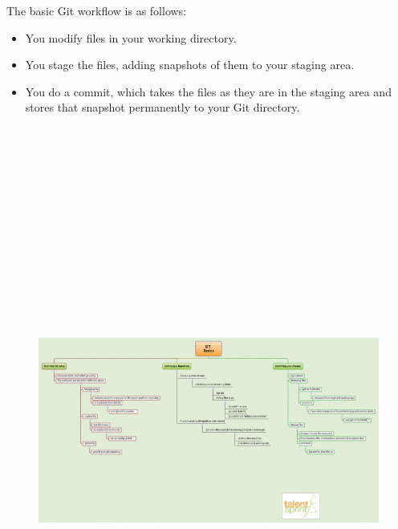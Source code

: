 \documentclass[11pt,a4paper]{article}
\begin{document}
The basic Git workflow is as follows:
\begin{itemize}
    \item You modify files in your working directory.
    \item You stage the files, adding snapshots of them to your staging area.
    \item You do a commit, which takes the files as they are in the staging area and stores that snapshot permanently to your Git directory.
\end{itemize}
\begin{figure}[H]
 \begin{center}
   \includegraphics[angle=90,height=20cm, width=12cm]{Git-MM-12.png}
 \end{center}
 \end{figure}
\end{document}
